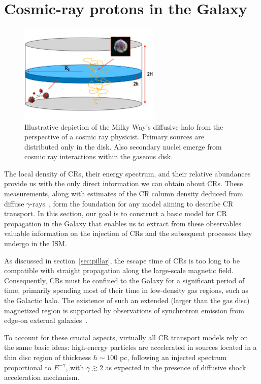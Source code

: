 \section{Cosmic-ray protons in the Galaxy}
\label{sec:protons}

\begin{figure}[t]
\centering
\includegraphics[width=0.6\textwidth]{figures/halo.pdf}
\caption{Illustrative depiction of the Milky Way's diffusive halo from the perspective of a cosmic ray physicist. Primary sources are distributed only in the disk. Also secondary nuclei emerge from cosmic ray interactions within the gaseous disk.}
\label{fig:galaxy}
\end{figure}

The local density of CRs, their energy spectrum, and their relative abundances provide us with the only direct information we can obtain about CRs. These measurements, along with estimates of the CR column density deduced from diffuse $\gamma$-rays~\cite{Tibaldo2021universe, Grenier2015araa}, form the foundation for any model aiming to describe CR transport.
%
In this section, our goal is to construct a basic model for CR propagation in the Galaxy that enables us to extract from these observables valuable information on the injection of CRs and the subsequent processes they undergo in the ISM.

As discussed in section~\ref{sec:pillar}, the escape time of CRs is too long to be compatible with straight propagation along the large-scale magnetic field. Consequently, CRs must be confined to the Galaxy for a significant period of time, primarily spending most of their time in low-density gas regions, such as the Galactic halo.
%
The existence of such an extended (larger than the gas disc) magnetized region is supported by observations of synchrotron emission from edge-on external galaxies~\cite{Beck2015aar}.

To account for these crucial aspects, virtually all CR transport models rely on the same basic ideas: high-energy particles are accelerated in sources located in a thin disc region of thickness $h \sim 100$ pc, following an injected spectrum proportional to $E^{-\gamma}$, with $\gamma \gtrsim 2$ as expected in the presence of diffusive shock acceleration mechanism.

